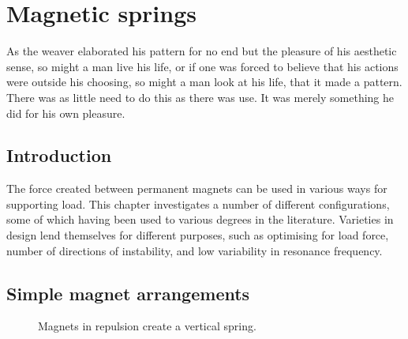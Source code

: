 \chapter{Magnetic springs}


\epigraph{As the weaver elaborated his pattern for no end but the
pleasure of his aesthetic sense, so might a man live his life, or if one
was forced to believe that his actions were outside his choosing, so might
a man look at his life, that it made a pattern. There was as little need
to do this as there was use. It was merely something he did for his own
pleasure.}{\textcite{maugham1915}}

\section{Introduction}

The force created between permanent magnets can be used in various ways for supporting load.
This chapter investigates a number of different configurations, some of which having been used to various degrees in the literature.
Varieties in design lend themselves for different purposes, such as optimising for load force, number of directions of instability, and low variability in resonance frequency.


\section{Simple magnet arrangements}

\begin{figure}
  \caption{Magnets in repulsion create a vertical spring.}
\end{figure}

